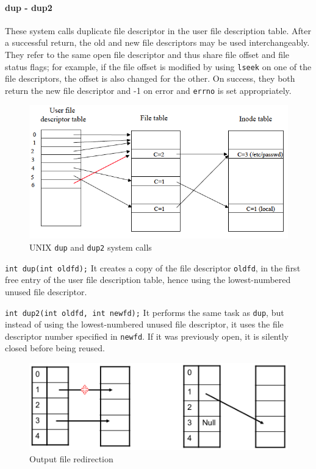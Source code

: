 \paragraph{dup - dup2}
These system calls duplicate file descriptor in the user file description table. After a successful return, the old and new file descriptors may be used interchangeably. They refer to the same open file descriptor and thus share file offset and file status flags; for example, if the file offset is modified by using \texttt{lseek} on one of the file descriptors, the offset is also changed for the other. On success, they both return the new file descriptor and -1 on error and \texttt{errno} is set appropriately.

\begin{figure}[hbtp]
\centering
\includegraphics[scale=0.4]{images/file_system/dup.png}
\caption{UNIX \texttt{dup} and \texttt{dup2} system calls}
\end{figure}

\texttt{int dup(int oldfd);} It creates a copy of the file descriptor \texttt{oldfd}, in the first free entry of the user file description table, hence using the lowest-numbered unused file descriptor.

\texttt{int dup2(int oldfd, int newfd);} It performs the same task as \texttt{dup}, but instead of using the lowest-numbered unused file descriptor, it uses the file descriptor number specified in \texttt{newfd}. If it was previously open, it is silently closed before being reused.
\medskip

\begin{figure}[hbtp]
\centering
\includegraphics[scale=0.4]{images/file_system/dup_file_redirection.png}
\caption{Output file redirection}
\label{dup_file_redirection}
\end{figure}

